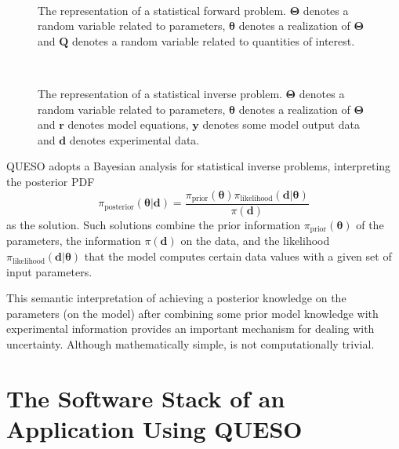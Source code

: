 \begin{figure}[h!]
\centerline{
\\
}
\caption{
The representation of a statistical forward problem.
$\boldsymbol{\Theta}$ denotes a random variable related to parameters,
$\boldsymbol{\theta}$ denotes a realization of $\boldsymbol{\Theta}$ and
$\mathbf{Q}$ denotes a random variable related to quantities of interest.
}
\label{fig-sfp-queso}
\end{figure}

\begin{figure}[h!]
\centerline{
\\
}
\caption{
The representation of a statistical inverse problem.
$\boldsymbol{\Theta}$ denotes a random variable related to parameters,
$\boldsymbol{\theta}$ denotes a realization of $\boldsymbol{\Theta}$ and
$\mathbf{r}$ denotes model equations,
$\mathbf{y}$ denotes some model output data and
$\mathbf{d}$ denotes experimental data.
}
\label{fig-sip-queso}
\end{figure}


QUESO adopts a Bayesian analysis \cite{KaSo05, Ro04} for statistical inverse problems, interpreting the posterior PDF
\begin{equation}\label{eq-Bayes-solution}
\pi_{\text{posterior}}(\boldsymbol{\theta}|\mathbf{d})=\frac{\pi_{\text{prior}}(\boldsymbol{\theta})\pi_{\text{likelihood}}(\mathbf{d}|\boldsymbol{\theta})}{\pi(\mathbf{d})}
\end{equation}
as the solution. Such solutions combine the prior information $\pi_{\text{prior}}(\boldsymbol{\theta})$ of the parameters,
the information $\pi(\mathbf{d})$ on the data, and the likelihood $\pi_{\text{likelihood}}(\mathbf{d}|\boldsymbol{\theta})$ that the model computes certain data values with a given set of input parameters.

This semantic interpretation of achieving a posterior knowledge on the parameters (on the model)
after combining some prior model knowledge with experimental information provides an important mechanism for dealing with uncertainty.
Although mathematically simple, is not computationally trivial. 


\section{The Software Stack of an Application Using QUESO}

